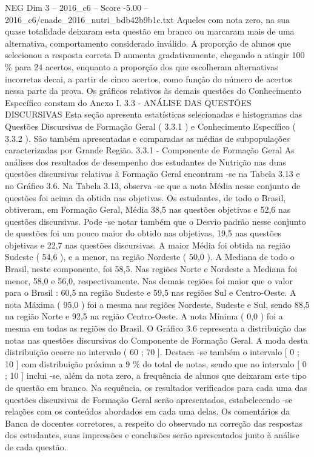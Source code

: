 \begin{textsample}{NEG Dim 3 – 2016\_c6 – Score -5.00 – 2016\_c6/enade\_2016\_nutri\_bdb42b9b1c.txt}
Aqueles com nota zero, na sua quase totalidade deixaram esta questão em branco ou marcaram mais de uma alternativa, comportamento considerado inválido.
A proporção de alunos que selecionou a resposta correta D aumenta gradativamente, chegando a atingir 100 \% para 24 acertos, enquanto a proporção dos que escolheram alternativas incorretas decai, a partir de cinco acertos, como função do número de acertos nessa parte da prova.
Os gráficos relativos às demais questões do Conhecimento Específico constam do Anexo I. 3.3 - ANÁLISE DAS QUESTÕES DISCURSIVAS Esta seção apresenta estatísticas selecionadas e histogramas das Questões Discursivas de Formação Geral ( 3.3.1 ) e Conhecimento Específico ( 3.3.2 ).
São também apresentadas e comparadas as médias de subpopulações caracterizadas por Grande Região. 3.3.1 - Componente de Formação Geral As análises dos resultados de desempenho dos estudantes de Nutrição nas duas questões discursivas relativas à Formação Geral encontram -se na Tabela 3.13 e no Gráfico 3.6.
Na Tabela 3.13, observa -se que a nota Média nesse conjunto de questões foi acima da obtida nas objetivas.
Os estudantes, de todo o Brasil, obtiveram, em Formação Geral, Média 38,5 nas questões objetivas e 52,6 nas questões discursivas.
Pode -se notar também que o Desvio padrão nesse conjunto de questões foi um pouco maior do obtido nas objetivas, 19,5 nas questões objetivas e 22,7 nas questões discursivas.
A maior Média foi obtida na região Sudeste ( 54,6 ), e a menor, na região Nordeste ( 50,0 ).
A Mediana de todo o Brasil, neste componente, foi 58,5.
Nas regiões Norte e Nordeste a Mediana foi menor, 58,0 e 56,0, respectivamente.
Nas demais regiões foi maior que o valor para o Brasil : 60,5 na região Sudeste e 59,5 nas regiões Sul e Centro-Oeste.
A nota Máxima ( 95,0 ) foi a mesma nas regiões Nordeste, Sudeste e Sul, sendo 88,5 na região Norte e 92,5 na região Centro-Oeste.
A nota Mínima ( 0,0 ) foi a mesma em todas as regiões do Brasil.
O Gráfico 3.6 representa a distribuição das notas nas questões discursivas do Componente de Formação Geral.
A moda desta distribuição ocorre no intervalo ( 60 ; 70 ].
Destaca -se também o intervalo [ 0 ; 10 ] com distribuição próxima a 9 \% do total de notas, sendo que no intervalo [ 0 ; 10 ] inclui -se, além da nota zero, a frequência de alunos que deixaram este tipo de questão em branco.
Na sequência, os resultados verificados para cada uma das questões discursivas de Formação Geral serão apresentados, estabelecendo -se relações com os conteúdos abordados em cada uma delas.
Os comentários da Banca de docentes corretores, a respeito do observado na correção das respostas dos estudantes, suas impressões e conclusões serão apresentados junto à análise de cada questão.

\end{textsample}
